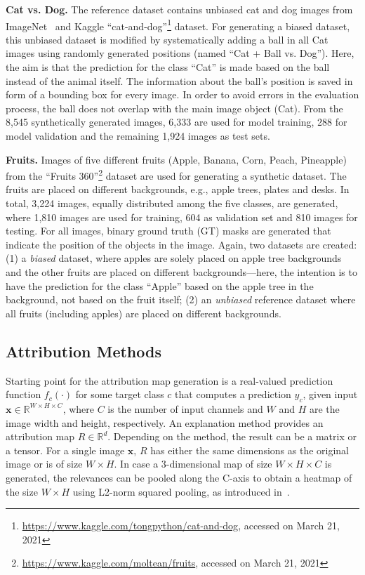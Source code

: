 \documentclass[runningheads]{llncs}
\begin{document}
\textbf{Cat vs. Dog.} 
The reference dataset contains unbiased cat and dog images from ImageNet~\cite{OlgaRussakovsky.2015} and Kaggle \enquote{cat-and-dog}\footnote{\url{https://www.kaggle.com/tongpython/cat-and-dog}, accessed on March 21, 2021} dataset. For generating a biased dataset, this unbiased dataset is modified by systematically adding a ball in all Cat images using randomly generated positions (named \enquote{Cat + Ball vs. Dog}). Here, the aim is that the prediction for the class \enquote{Cat} is made based on the ball instead of the animal itself. The information about the ball's position is saved in form of a bounding box for every image. In order to avoid errors in the evaluation process, the ball does not overlap with the main image object (Cat). From the 8,545 synthetically generated images, 6,333 are used for model training, 288 for model validation and the remaining 1,924 images as test sets.

\textbf{Fruits.} Images of five different fruits (Apple, Banana, Corn, Peach, Pineapple) from the  \enquote{Fruits 360}\footnote{\url{https://www.kaggle.com/moltean/fruits}, accessed on March 21, 2021} dataset are used for generating a synthetic dataset. The fruits are placed on different backgrounds, e.g., apple trees, plates and desks. In total, 3,224 images, equally distributed among the five classes, are generated, where 1,810 images are used for training, 604 as validation set and 810 images for testing. For all images, binary ground truth (GT) masks are generated that indicate the position of the objects in the image. Again, two datasets are created: (1) a \emph{biased} dataset, where apples are solely placed on apple tree backgrounds and the other fruits are placed on different backgrounds---here, the intention is to have the prediction for the class \enquote{Apple} based on the apple tree in the background, not based on the fruit itself; (2) an \emph{unbiased} reference dataset where all fruits (including apples) are placed on different backgrounds.

\vspace{-2mm}
\subsection{Attribution Methods}\label{sec:attributions}
Starting point for the attribution map generation is a real-valued prediction function $f_c(\cdot)$ for some target class $c$ that computes a prediction $y_c$, given input $\mathbf{x} \in \mathbb{R}^{W \times H \times C}$, where $C$ is the number of input channels and $W$ and $H$ are the image width and height, respectively. An explanation method provides an attribution map $R \in \mathbb{R}^d$. Depending on the method, the result can be a matrix or a tensor. For a single image $\mathbf{x}$, $R$ has either the same dimensions as the original image or is of size $W \times H$. In case a 3-dimensional map of size $W \times H \times C$ is generated, the relevances can be pooled along the C-axis to obtain a heatmap of the size $W \times H$ using L2-norm squared pooling, as introduced in~\cite{Osman.2020}.
\end{document}
